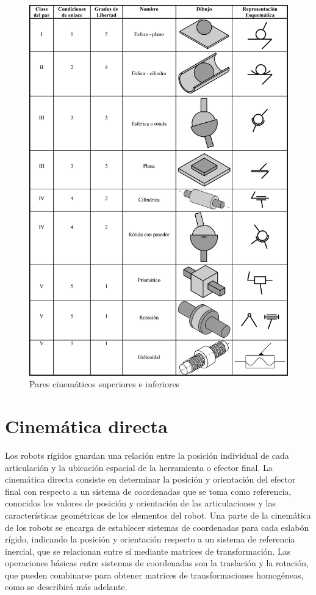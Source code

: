 \begin{figure}
	\centering
	\includegraphics[scale=1.0]{Capitulo2/figs/pares.png} 
	\caption{Pares cinemáticos superiores e inferiores}
	\label{pares}
\end{figure}

\section{Cinemática directa}

Los robots rígidos guardan una relación entre la posición individual de cada articulación y la ubicación espacial de la herramienta o efector final. La cinemática directa consiste en determinar la posición y orientación del efector final con respecto a un sistema de coordenadas que se toma como referencia, conocidos los valores de posición y orientación de las articulaciones y las características geométricas de los elementos del robot. Una parte de la cinemática de los robots se encarga de establecer sistemas de coordenadas para cada eslabón rígido, indicando la posición y orientación respecto a un sistema de referencia inercial, que se relacionan entre sí mediante matrices de transformación. Las operaciones básicas entre sistemas de coordenadas son la traslación y la rotación, que pueden combinarse para obtener matrices de transformaciones homogéneas, como se describirá más adelante.


